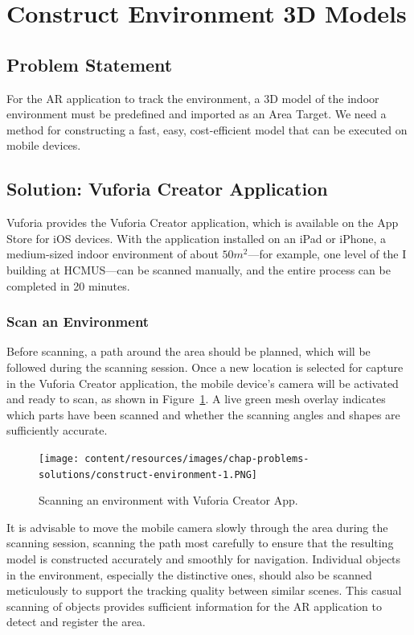 \section{Construct Environment 3D Models}\label{sec:construct-environment}
\subsection{Problem Statement}
For the AR application to track the environment, a 3D model of the indoor environment must be predefined and imported as an Area Target. We need a method for constructing a fast, easy, cost-efficient model that can be executed on mobile devices.

\subsection{Solution: Vuforia Creator Application}
Vuforia provides the Vuforia Creator application, which is available on the App Store for iOS devices. With the application installed on an iPad or iPhone, a medium-sized indoor environment of about $50m^2$—for example, one level of the I building at HCMUS—can be scanned manually, and the entire process can be completed in 20 minutes.

\subsubsection{Scan an Environment}
Before scanning, a path around the area should be planned, which will be followed during the scanning session. Once a new location is selected for capture in the Vuforia Creator application, the mobile device's camera will be activated and ready to scan, as shown in Figure~\ref{fig:construct-environment-1}. A live green mesh overlay indicates which parts have been scanned and whether the scanning angles and shapes are sufficiently accurate.

\begin{figure}[ht]
  \centering
  \texttt{[image: content/resources/images/chap-problems-solutions/construct-environment-1.PNG]}
  \caption{Scanning an environment with Vuforia Creator App.}
  \label{fig:construct-environment-1}
\end{figure}

It is advisable to move the mobile camera slowly through the area during the scanning session, scanning the path most carefully to ensure that the resulting model is constructed accurately and smoothly for navigation. Individual objects in the environment, especially the distinctive ones, should also be scanned meticulously to support the tracking quality between similar scenes. This casual scanning of objects provides sufficient information for the AR application to detect and register the area.

